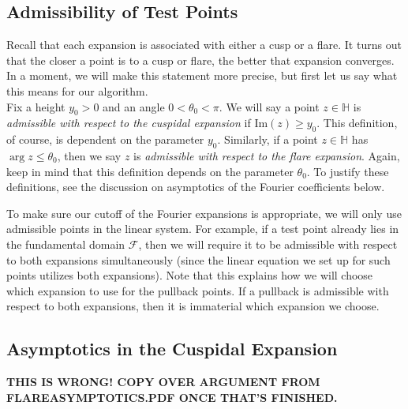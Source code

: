 \documentclass[]{article}
\begin{document}
\subsection*{Admissibility of Test Points}

Recall that each expansion is associated with either a cusp or a flare.
It turns out that the closer a point is to a cusp or flare, the better that expansion converges.
In a moment, we will make this statement more precise, but first let us say what this means for our algorithm.
\\

Fix a height $y_0 > 0$ and an angle $0 < \theta_0 < \pi$.
We will say a point $z \in \mathbb{H}$ is \textit{admissible with respect to the cuspidal expansion} if $\text{Im}(z) \geq y_0$.
This definition, of course, is dependent on the parameter $y_0$.
Similarly, if a point $z \in \mathbb{H}$ has $\arg z \leq \theta_0$, then we say $z$ is \textit{admissible with respect to the flare expansion}.
Again, keep in mind that this definition depends on the parameter $\theta_0$.
To justify these definitions, see the discussion on asymptotics of the Fourier coefficients below.

To make sure our cutoff of the Fourier expansions is appropriate, we will only use admissible points in the linear system.
For example, if a test point already lies in the fundamental domain $\mathcal{F}$, then we will require it to be admissible with respect to both expansions simultaneously (since the linear equation we set up for such points utilizes both expansions).
Note that this explains how we will choose which expansion to use for the pullback points.
If a pullback is admissible with respect to both expansions, then it is immaterial which expansion we choose.

\subsection*{Asymptotics in the Cuspidal Expansion}

\textbf{THIS IS WRONG! COPY OVER ARGUMENT FROM FLAREASYMPTOTICS.PDF ONCE THAT'S FINISHED.}
\end{document}
